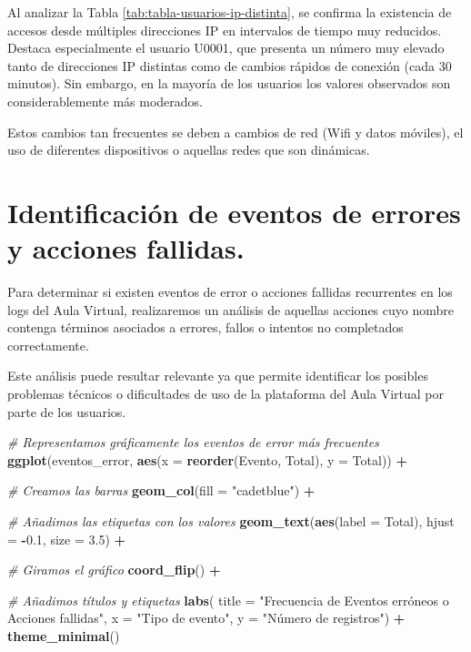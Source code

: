 \documentclass[notspecified,article,submit,moreauthors,pdftex]{Definitions/mdpi}
\newenvironment{Shaded}{\begin{snugshade}}{\end{snugshade}}
\newcommand{\AttributeTok}[1]{\textcolor[rgb]{0.13,0.29,0.53}{#1}}
\newcommand{\CommentTok}[1]{\textcolor[rgb]{0.56,0.35,0.01}{\textit{#1}}}
\newcommand{\FloatTok}[1]{\textcolor[rgb]{0.00,0.00,0.81}{#1}}
\newcommand{\FunctionTok}[1]{\textcolor[rgb]{0.13,0.29,0.53}{\textbf{#1}}}
\newcommand{\NormalTok}[1]{#1}
\newcommand{\SpecialCharTok}[1]{\textcolor[rgb]{0.81,0.36,0.00}{\textbf{#1}}}
\newcommand{\StringTok}[1]{\textcolor[rgb]{0.31,0.60,0.02}{#1}}
\begin{document}
Al analizar la Tabla \ref{tab:tabla-usuarios-ip-distinta}, se confirma
la existencia de accesos desde múltiples direcciones IP en intervalos de
tiempo muy reducidos. Destaca especialmente el usuario U0001, que
presenta un número muy elevado tanto de direcciones IP distintas como de
cambios rápidos de conexión (cada 30 minutos). Sin embargo, en la
mayoría de los usuarios los valores observados son considerablemente más
moderados.

Estos cambios tan frecuentes se deben a cambios de red (Wifi y datos
móviles), el uso de diferentes dispositivos o aquellas redes que son
dinámicas.

\section{Identificación de eventos de errores y acciones
fallidas.}\label{identificaciuxf3n-de-eventos-de-errores-y-acciones-fallidas.}

Para determinar si existen eventos de error o acciones fallidas
recurrentes en los logs del Aula Virtual, realizaremos un análisis de
aquellas acciones cuyo nombre contenga términos asociados a errores,
fallos o intentos no completados correctamente.

Este análisis puede resultar relevante ya que permite identificar los
posibles problemas técnicos o dificultades de uso de la plataforma del
Aula Virtual por parte de los usuarios.

\begin{Shaded}
\begin{Highlighting}[]
\CommentTok{\# Representamos gráficamente los eventos de error más frecuentes}
\FunctionTok{ggplot}\NormalTok{(eventos\_error, }\FunctionTok{aes}\NormalTok{(}\AttributeTok{x =} \FunctionTok{reorder}\NormalTok{(Evento, Total),}
           \AttributeTok{y =}\NormalTok{ Total)) }\SpecialCharTok{+}
  
  \CommentTok{\# Creamos las barras}
  \FunctionTok{geom\_col}\NormalTok{(}\AttributeTok{fill =} \StringTok{"cadetblue"}\NormalTok{) }\SpecialCharTok{+}
  
  
  \CommentTok{\# Añadimos las etiquetas con los valores}
  \FunctionTok{geom\_text}\NormalTok{(}\FunctionTok{aes}\NormalTok{(}\AttributeTok{label =}\NormalTok{ Total),}
            \AttributeTok{hjust =} \SpecialCharTok{{-}}\FloatTok{0.1}\NormalTok{,}
            \AttributeTok{size =} \FloatTok{3.5}\NormalTok{) }\SpecialCharTok{+}
  
  \CommentTok{\# Giramos el gráfico}
  \FunctionTok{coord\_flip}\NormalTok{() }\SpecialCharTok{+}
  
  \CommentTok{\# Añadimos títulos y etiquetas}
  \FunctionTok{labs}\NormalTok{(}
    \AttributeTok{title =} \StringTok{"Frecuencia de Eventos erróneos o Acciones fallidas"}\NormalTok{,}
    \AttributeTok{x =} \StringTok{"Tipo de evento"}\NormalTok{,}
    \AttributeTok{y =} \StringTok{"Número de registros"}\NormalTok{) }\SpecialCharTok{+}
  \FunctionTok{theme\_minimal}\NormalTok{()}
\end{Highlighting}
\end{Shaded}
\end{document}
